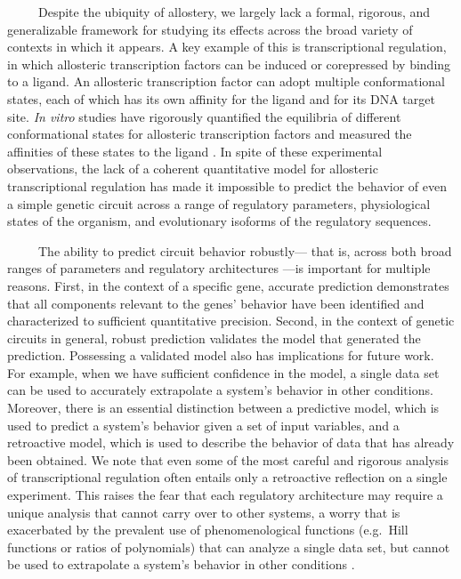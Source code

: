 \documentclass[12pt]{caltech_thesis}
\begin{document}
~~~~~Despite the ubiquity of allostery, we largely lack a formal,
rigorous, and generalizable framework for studying its effects across
the broad variety of contexts in which it appears. A key example of this
is transcriptional regulation, in which allosteric transcription factors
can be induced or corepressed by binding to a ligand. An allosteric
transcription factor can adopt multiple conformational states, each of
which has its own affinity for the ligand and for its DNA target site.
\emph{In vitro} studies have rigorously quantified the equilibria of
different conformational states for allosteric transcription factors and
measured the affinities of these states to the ligand
\autocite{harman2001,lanfranco2017}. In spite of these experimental
observations, the lack of a coherent quantitative model for allosteric
transcriptional regulation has made it impossible to predict the
behavior of even a simple genetic circuit across a range of regulatory
parameters, physiological states of the organism, and evolutionary
isoforms of the regulatory sequences.

~~~~~The ability to predict circuit behavior robustly--- that is, across
both broad ranges of parameters and regulatory architectures ---is
important for multiple reasons. First, in the context of a specific
gene, accurate prediction demonstrates that all components relevant to
the genes' behavior have been identified and characterized to sufficient
quantitative precision. Second, in the context of genetic circuits in
general, robust prediction validates the model that generated the
prediction. Possessing a validated model also has implications for
future work. For example, when we have sufficient confidence in the
model, a single data set can be used to accurately extrapolate a
system's behavior in other conditions. Moreover, there is an essential
distinction between a predictive model, which is used to predict a
system's behavior given a set of input variables, and a retroactive
model, which is used to describe the behavior of data that has already
been obtained. We note that even some of the most careful and rigorous
analysis of transcriptional regulation often entails only a retroactive
reflection on a single experiment. This raises the fear that each
regulatory architecture may require a unique analysis that cannot carry
over to other systems, a worry that is exacerbated by the prevalent use
of phenomenological functions (e.g.~Hill functions or ratios of
polynomials) that can analyze a single data set, but cannot be used to
extrapolate a system's behavior in other conditions
\autocite{setty2003,poelwijk2011a,vilar2013,rogers2015,rohlhill2017}.
\end{document}
